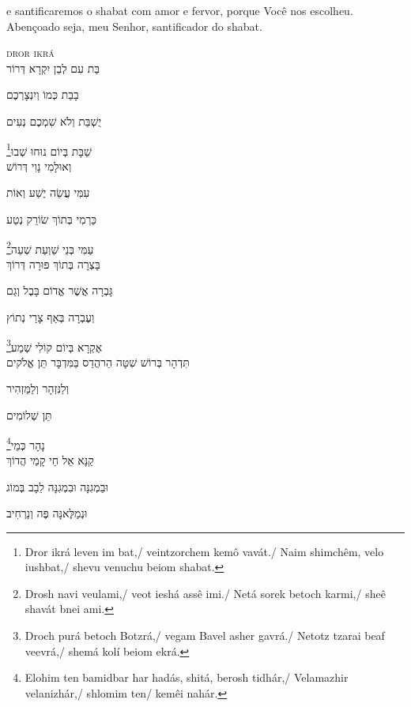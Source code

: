 e santificaremos o shabat com amor e fervor, porque Você nos escolheu.\\[10pt]


Abençoado seja, meu Senhor, santificador do shabat.


\movetoevenpage
\raggedleft
{}

\vspace*{1cm}

\textsc{dror ikrá}\\[15pt]


בַּת עִם לְבֵן יִקְרָא דְּרוֹר

בָבַת כְּמוֹ וְיִנְצָרְכֶם

יֻשְׁבַּת וְלֹא שִׁמְכֶם נְעִים

\footnote{Dror ikrá leven im bat,/ veintzorchem kemô vavát./ Naim shimchêm, velo iushbat,/ shevu venuchu beiom shabat.}שַׁבָּת בְּיוֹם נוּחוּ שְׁבוּ\\[10pt]


וְאוּלָמִי נָוִי דְּרוֹשׁ

עִמִּי עֲשֵׂה יֶשַׁע וְאוֹת

כַּרְמִי בְּתוֹךְ שׂוֹרֵק נְטַע

\footnote{Drosh navi veulami,/ veot ieshá assê imi./ Netá sorek betoch karmi,/ sheê shavát bnei ami.}עַמִּי בְּנֵי שַׁוְעַת שְׁעֵה\\[10pt]



בָּצְרָה בְּתוֹךְ פּוּרָה דְּרוֹךְ

גָּבְרָה אֲשֶׁר אֱדוֹם בָּבֶל וְגַם

וְעֶבְרָה בְּאַף צָרַי נְתוֹץ

\footnote{Droch purá betoch Botzrá,/ vegam Bavel asher gavrá./ Netotz tzarai beaf veevrá,/ shemá kolí beiom ekrá.}אֶקְרָא בְּיוֹם קוֹלִי שְׁמַע\\[10pt]


תִּדְהָר בְּרוֹשׁ שִׁטָּה הַרהֲדַס בַּמִּדְבָּר תֵּן אֱלֹקים

וְלַנִּזְהָר וְלַמַּזְהִיר

תֵּן שְׁלוֹמִים

\footnote{Elohim ten bamidbar har hadás, shitá, berosh tidhár,/ Velamazhir velanizhár,/ shlomim ten/ kemêi nahár.}נָהָר כְּמֵי\\[10pt]

קַנָּא אֵל חַי קָמַי הֲדוֹךְ

וּבַמְגִנָּה וּבִמְגִנָּה לֵבָב בְּמוֹג

וּנְמַלֶּאנָּה פֶּה וְנַרְחִיב

